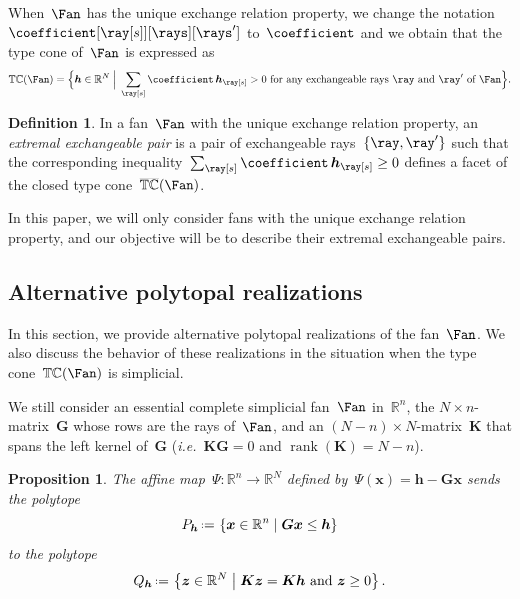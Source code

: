 \documentclass{amsart}
\newtheorem{proposition}[theorem]{Proposition}
\theoremstyle{definition}
\newtheorem{definition}[theorem]{Definition}
\newcommand{\R}{\mathbb{R}} %
\renewcommand{\b}[1]{{\boldsymbol{#1}}} %
\newcommand{\set}[2]{\left\{ #1 \;\middle|\; #2 \right\}} %
\newcommand{\Bigset}[2]{\Big\{ #1 \;\Big|\; #2 \Big\}} %
\newcommand{\eqdef}{\mbox{\,\raisebox{0.2ex}{\scriptsize\ensuremath{\mathrm:}}\ensuremath{=}\,}} %
\DeclareMathOperator{\rank}{rank} %
\newcommand{\ie}{\textit{i.e.}~} %
\newcommand{\darkblue}{\color{darkblue}} %
\newcommand{\defn}[1]{\textsl{\darkblue #1}} %
\newcommand{\typeCone}{\mathbb{TC}} %
\newcommand{\ctypeCone}{\smash{\overline{\mathbb{TC}}}} %
\begin{document}
When~$\Fan$ has the unique exchange relation property, we change the notation~$\coefficient[{\ray[s]}][\rays][\rays']$ to~$\coefficient$ and we obtain that the type cone of~$\Fan$ is expressed as
\[
\typeCone(\Fan) = \Bigset{\b{h} \in \R^N}{\sum_{\ray[s]} \coefficient \, \b{h}_{\ray[s]} > 0 \text{ for any exchangeable rays~$\ray$ and~$\ray'$ of~$\Fan$}}.
\]

\begin{definition}
In a fan~$\Fan$ with the unique exchange relation property, an \defn{extremal exchangeable pair} is a pair of exchangeable rays~$\{\ray,\ray'\}$ such that the corresponding inequality~${\sum_{\ray[s]} \coefficient \, \b{h}_{\ray[s]} \ge  0}$ defines a facet of the closed type cone~$\ctypeCone(\Fan)$.
\end{definition}

In this paper, we will only consider fans with the unique exchange relation property, and our objective will be to describe their extremal exchangeable pairs.


\subsection{Alternative polytopal realizations}

In this section, we provide alternative polytopal realizations of the fan~$\Fan$.
We also discuss the behavior of these realizations in the situation when the type cone~$\typeCone(\Fan)$ is simplicial.

We still consider an essential complete simplicial fan~$\Fan$ in~$\R^n$, the $N \times n$-matrix~$\b{G}$ whose rows are the rays of~$\Fan$, and an $(N-n) \times N$-matrix~$\b{K}$ that spans the left kernel of~$\b{G}$ (\ie $\b{K}\b{G} = 0$ and $\rank(\b{K})=N-n$).

\begin{proposition}
\label{prop:alternativePolytopalRealization}
The affine map~$\Psi: \R^n \to \R^N$ defined by~$\Psi(\b{x}) = \b{h} - \b{G}\b{x}$ sends the polytope
\[
P_\b{h} \eqdef \set{\b{x} \in \R^n}{\b{G}\b{x} \le \b{h}}
\]
to the polytope
\[
Q_\b{h} \eqdef \set{\b{z} \in \R^N}{\b{K}\b{z} = \b{K}\b{h} \text{ and } \b{z} \ge 0}.
\]
\end{proposition}
\end{document}
